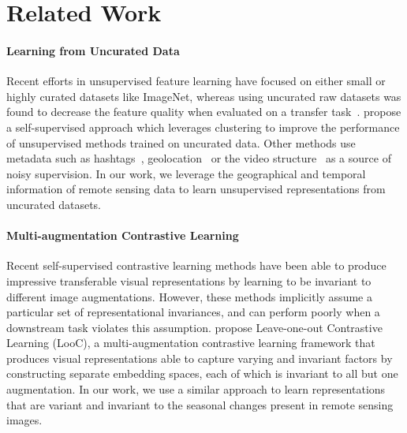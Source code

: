 \documentclass[10pt,twocolumn,letterpaper]{article}
\begin{document}
\section{Related Work}

\paragraph{Learning from Uncurated Data}
Recent efforts in unsupervised feature learning have focused on either small or highly curated datasets like ImageNet, whereas using uncurated raw datasets was found to decrease the feature quality when evaluated on a transfer task~\cite{doersch2015unsupervised, caron2018deep}. \citet{caron2019unsupervised} propose a self-supervised approach which leverages clustering to improve the performance of unsupervised methods trained on uncurated data. Other methods use metadata such as hashtags~\cite{joulin2016learning, sun2017revisiting, mahajan2018exploring}, geolocation~\cite{weyand2016planet} or the video structure~\cite{gordon2020watching} as a source of noisy supervision. In our work, we leverage the geographical and temporal information of remote sensing data to learn unsupervised representations from uncurated datasets.

\vspace{-1em}\paragraph{Multi-augmentation Contrastive Learning}
Recent self-supervised contrastive learning methods have been able to produce impressive transferable visual representations by learning to be invariant to different image augmentations. However, these methods implicitly assume a particular set of representational invariances, and can perform poorly when a downstream task violates this assumption. \citet{xiao2020should} propose Leave-one-out Contrastive Learning (LooC), a multi-augmentation contrastive learning framework that produces visual representations able to capture varying and invariant factors by constructing separate embedding spaces, each of which is invariant to all but one augmentation. In our work, we use a similar approach to learn representations that are variant and invariant to the seasonal changes present in remote sensing images.
\end{document}
